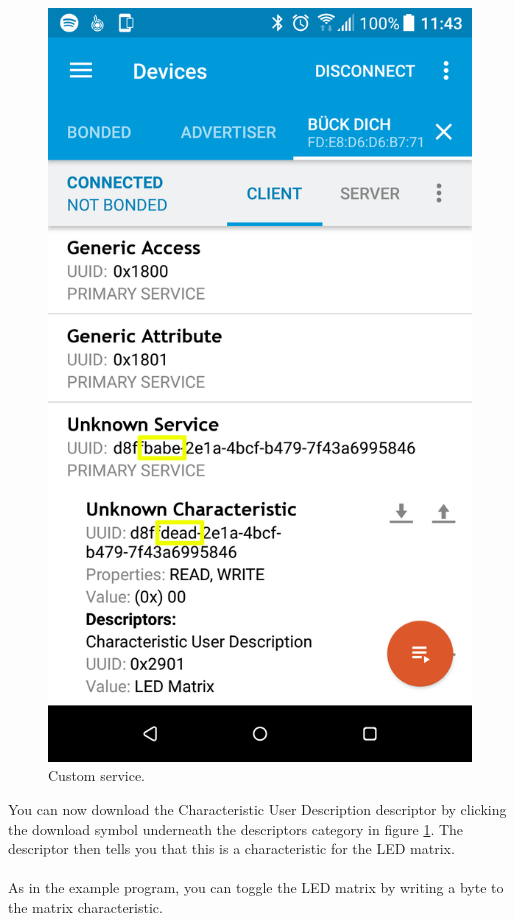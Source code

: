 \documentclass[11pt,a4paper]{article}
\begin{document}
\begin{figure}[ht]
\begin{minipage}{0.5\linewidth}
\includegraphics[width=0.9\linewidth]{example_exercise_gatt_highlighted.png}
\caption{Custom service.}
\label{fig::exercise_service}
\end{minipage}
\end{figure}\noindent
You can now download the Characteristic User Description descriptor by clicking the download symbol underneath the descriptors category in figure \ref{fig::exercise_service}. The descriptor then tells you that this is a characteristic for the LED matrix.\\
\\
As in the example program, you can toggle the LED matrix by writing a byte to the matrix characteristic.
\end{document}

